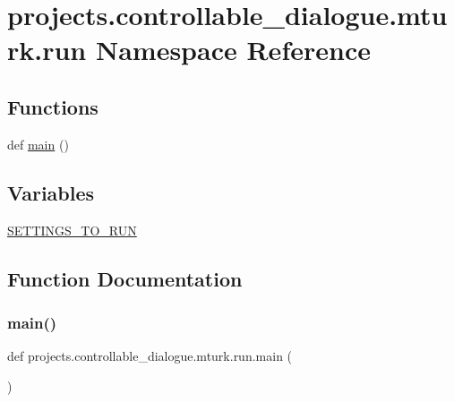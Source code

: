 \hypertarget{namespaceprojects_1_1controllable__dialogue_1_1mturk_1_1run}{}\section{projects.\+controllable\+\_\+dialogue.\+mturk.\+run Namespace Reference}
\label{namespaceprojects_1_1controllable__dialogue_1_1mturk_1_1run}
\subsection*{Functions}
\begin{DoxyCompactItemize}
\item 
def \hyperlink{namespaceprojects_1_1controllable__dialogue_1_1mturk_1_1run_a535cc92a62da8a5bd2541bac398e3c14}{main} ()
\end{DoxyCompactItemize}
\subsection*{Variables}
\begin{DoxyCompactItemize}
\item 
\hyperlink{namespaceprojects_1_1controllable__dialogue_1_1mturk_1_1run_a64b64f72355020479b4a864813c0159c}{S\+E\+T\+T\+I\+N\+G\+S\+\_\+\+T\+O\+\_\+\+R\+UN}
\end{DoxyCompactItemize}


\subsection{Function Documentation}
\mbox{\label{namespaceprojects_1_1controllable__dialogue_1_1mturk_1_1run_a535cc92a62da8a5bd2541bac398e3c14}} 
\subsubsection{\texorpdfstring{main()}{main()}}
{\footnotesize\ttfamily def projects.\+controllable\+\_\+dialogue.\+mturk.\+run.\+main (\begin{DoxyParamCaption}{ }\end{DoxyParamCaption})}

